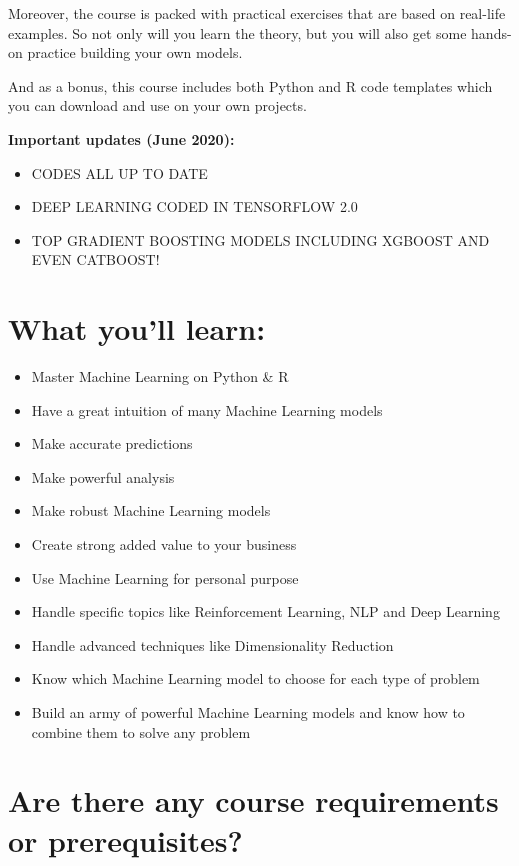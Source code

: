 \documentclass[
]{book}
\theoremstyle{definition}
\theoremstyle{definition}
\theoremstyle{definition}
\theoremstyle{definition}
\theoremstyle{remark}
\begin{document}
Moreover, the course is packed with practical exercises that are based on real-life examples. So not only will you learn the theory, but you will also get some hands-on practice building your own models.

And as a bonus, this course includes both Python and R code templates which you can download and use on your own projects.

\textbf{Important updates (June 2020):}

\begin{itemize}
\item
  CODES ALL UP TO DATE
\item
  DEEP LEARNING CODED IN TENSORFLOW 2.0
\item
  TOP GRADIENT BOOSTING MODELS INCLUDING XGBOOST AND EVEN CATBOOST!
\end{itemize}

\hypertarget{what-youll-learn}{%
\section*{What you'll learn:}\label{what-youll-learn}}

\begin{itemize}
\item
  Master Machine Learning on Python \& R
\item
  Have a great intuition of many Machine Learning models
\item
  Make accurate predictions
\item
  Make powerful analysis
\item
  Make robust Machine Learning models
\item
  Create strong added value to your business
\item
  Use Machine Learning for personal purpose
\item
  Handle specific topics like Reinforcement Learning, NLP and Deep Learning
\item
  Handle advanced techniques like Dimensionality Reduction
\item
  Know which Machine Learning model to choose for each type of problem
\item
  Build an army of powerful Machine Learning models and know how to combine them to solve any problem
\end{itemize}

\hypertarget{are-there-any-course-requirements-or-prerequisites}{%
\section*{Are there any course requirements or prerequisites?}\label{are-there-any-course-requirements-or-prerequisites}}
\end{document}
